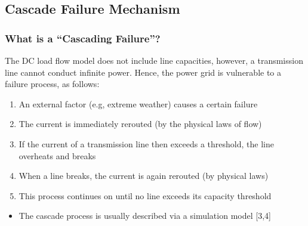 \documentclass{beamer}
\begin{document}
\subsection{Cascade Failure Mechanism}
\begin{frame}
\frametitle{What is a ``Cascading Failure''?}\small
The DC load flow model does not include line capacities, however, a transmission line cannot conduct infinite power. Hence, the power grid is vulnerable to a failure process, as follows:
\begin{enumerate}
  \item<1->An external factor (e.g, extreme weather) causes a certain failure
	\item<2->The current is immediately rerouted (by the physical laws of flow)
	\item<3->If the current of a transmission line then exceeds a threshold, the line overheats and breaks
	\item<4->When a line breaks, the current is again rerouted (by physical laws)
	\item<5->This process continues on until no line exceeds its capacity threshold
\end{enumerate}
\begin{itemize}
	\item<6->The cascade process is usually described via a simulation model [3,4]
\end{itemize}

\end{frame}
\end{document}
